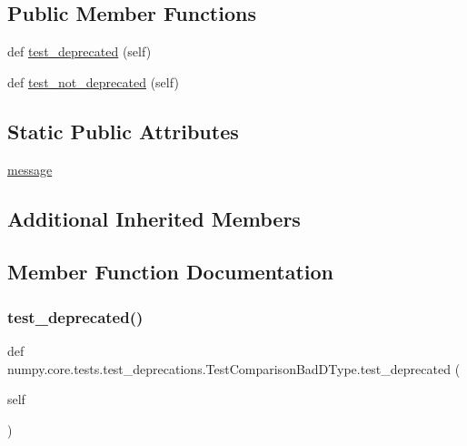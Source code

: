 \subsection*{Public Member Functions}
\begin{DoxyCompactItemize}
\item 
def \hyperlink{classnumpy_1_1core_1_1tests_1_1test__deprecations_1_1TestComparisonBadDType_a894eeafb6b2d6b7106415b27404ff4fa}{test\+\_\+deprecated} (self)
\item 
def \hyperlink{classnumpy_1_1core_1_1tests_1_1test__deprecations_1_1TestComparisonBadDType_aa7006f98f766180974820fdb1828b2b9}{test\+\_\+not\+\_\+deprecated} (self)
\end{DoxyCompactItemize}
\subsection*{Static Public Attributes}
\begin{DoxyCompactItemize}
\item 
\hyperlink{classnumpy_1_1core_1_1tests_1_1test__deprecations_1_1TestComparisonBadDType_ac4dc4e83cbd664d338db9b84f0ef58cb}{message}
\end{DoxyCompactItemize}
\subsection*{Additional Inherited Members}


\subsection{Member Function Documentation}
\mbox{\label{classnumpy_1_1core_1_1tests_1_1test__deprecations_1_1TestComparisonBadDType_a894eeafb6b2d6b7106415b27404ff4fa}} 
\subsubsection{\texorpdfstring{test\+\_\+deprecated()}{test\_deprecated()}}
{\footnotesize\ttfamily def numpy.\+core.\+tests.\+test\+\_\+deprecations.\+Test\+Comparison\+Bad\+D\+Type.\+test\+\_\+deprecated (\begin{DoxyParamCaption}\item[{}]{self }\end{DoxyParamCaption})}

